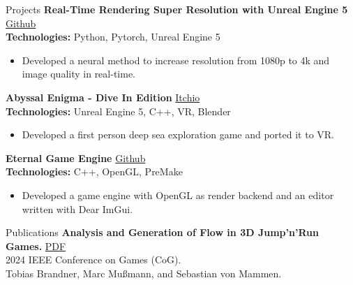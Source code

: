 \documentclass{resume} %
\begin{document}
\begin{rSection}{Projects}
{\bf Real-Time Rendering Super Resolution with Unreal Engine 5} \hfill {\href{https://github.com/BrandnerKasper/URTSR}{Github}} \\
{\bf Technologies:} Python, Pytorch, Unreal Engine 5
\begin{itemize}
    \item Developed a neural method to increase resolution from 1080p to 4k and image quality in real-time.
\end{itemize}

{\bf Abyssal Enigma - Dive In Edition} \hfill {\href{https://miggli.itch.io/abyssal-enigma/devlog/638746/abyssal-engima-dive-in-edition-vr}{Itchio}} \\
{\bf Technologies:} Unreal Engine 5, C++, VR, Blender
\begin{itemize}
    \item Developed a first person deep sea exploration game and ported it to VR.
\end{itemize}

{\bf Eternal Game Engine} \hfill {\href{https://github.com/BrandnerKasper/Eternal}{Github}} \\
{\bf Technologies:} C++, OpenGL, PreMake
\begin{itemize}
    \item Developed a game engine with OpenGL as render backend and an editor written with Dear ImGui.
\end{itemize}
\end{rSection}

\begin{rSection}{Publications}
{\bf Analysis and Generation of Flow in 3D Jump’n’Run Games.} \hfill {\href{https://ieeexplore.ieee.org/abstract/document/10645536}{PDF}}\\
2024 IEEE Conference on Games (CoG).\\
Tobias Brandner, Marc Mußmann, and Sebastian von Mammen.\\

\end{rSection}
\end{document}

